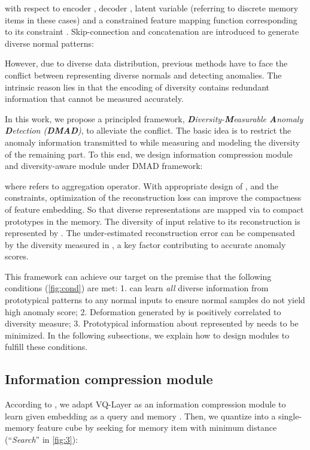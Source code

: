 \documentclass[10pt,twocolumn,letterpaper]{article}
\begin{document}
        \noindent
        with respect to encoder , decoder , latent variable  (referring to discrete memory items in these cases) and a constrained feature mapping function  corresponding to its constraint . Skip-connection and concatenation  are introduced to generate diverse normal patterns\cite{mnad}:
        
        However, due to diverse data distribution, previous methods have to face the conflict between representing diverse normals and detecting anomalies. The intrinsic reason lies in that the encoding of diversity  contains redundant information that cannot be measured accurately.
         
    In this work, we propose a principled framework, \textit{\textbf{D}iversity-\textbf{M}easurable \textbf{A}nomaly \textbf{D}etection (\textbf{DMAD})}, to alleviate the conflict. 
    The basic idea is to restrict the anomaly information transmitted to  while measuring and modeling the diversity of the remaining part. To this end, we design information compression module  and diversity-aware module  under DMAD framework:
        
        \noindent
        where  refers to aggregation operator. With appropriate design of ,  and the constraints, optimization of the reconstruction loss can improve the compactness of feature embedding. So that diverse representations are mapped via  to compact prototypes in the memory. The diversity of input  relative to its reconstruction is represented by . The under-estimated reconstruction error can be compensated by the diversity measured in , a key factor contributing to accurate anomaly scores.
        
        This framework can achieve our target on the premise that the following conditions (\cref{fig:cond}) are met: 1.  can learn \textit{all} diverse information from prototypical patterns to any normal inputs to ensure normal samples do not yield high anomaly score; 2. Deformation generated by  is positively correlated to diversity measure; 3. Prototypical information about  represented by  needs to be minimized. In the following subsections, we explain how to design modules to fulfill these conditions.


 \subsection{Information compression module}
            According to \cite{vqvae}, we adapt VQ-Layer as an information compression module to learn  given embedding  as a query  and memory . Then, we quantize  into a single-memory feature cube  by seeking for memory item with minimum  distance (``\textit{Search}'' in \cref{fig:3}):
            
\end{document}

